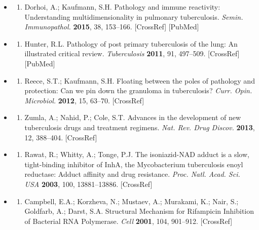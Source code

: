 \documentclass{article}
\begin{document}
\begin{itemize}
\item \begin{enumerate}
\item 
Dorhoi, A.; Kaufmann, S.H. Pathology and immune reactivity: Understanding multidimensionality in pulmonary tuberculosis. \textit{Semin. Immunopathol.} \textbf{2015}, 38, 153–166. [CrossRef] [PubMed]

\end{enumerate}

\item \begin{enumerate}
\item 
Hunter, R.L. Pathology of post primary tuberculosis of the lung: An illustrated critical review. \textit{Tuberculosis} \textbf{2011}, 91, 497–509. [CrossRef] [PubMed]

\end{enumerate}

\item \begin{enumerate}
\item 
Reece, S.T.; Kaufmann, S.H. Floating between the poles of pathology and protection: Can we pin down the granuloma in tuberculosis? \textit{Curr. Opin. Microbiol.} \textbf{2012}, 15, 63–70. [CrossRef]

\end{enumerate}

\item \begin{enumerate}
\item 
Zumla, A.; Nahid, P.; Cole, S.T. Advances in the development of new tuberculosis drugs and treatment regimens. \textit{Nat. Rev. Drug Discov.} \textbf{2013}, 12, 388–404. [CrossRef]

\end{enumerate}

\item \begin{enumerate}
\item 
Rawat, R.; Whitty, A.; Tonge, P.J. The isoniazid-NAD adduct is a slow, tight-binding inhibitor of InhA, the Mycobacterium tuberculosis enoyl reductase: Adduct affinity and drug resistance. \textit{Proc. Natl. Acad. Sci. USA} \textbf{2003}, 100, 13881–13886. [CrossRef]

\end{enumerate}

\item \begin{enumerate}
\item 
Campbell, E.A.; Korzheva, N.; Mustaev, A.; Murakami, K.; Nair, S.; Goldfarb, A.; Darst, S.A. Structural Mechanism for Rifampicin Inhibition of Bacterial RNA Polymerase. \textit{Cell} \textbf{2001}, 104, 901–912. [CrossRef]


\end{enumerate}
\end{itemize}
\end{document}
